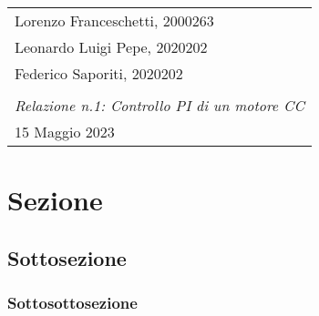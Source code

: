 \documentclass[a4paper, 11pt, Arial]{article}
\newcommand{\class}{Laboratorio di Automatica}
\newcommand{\expT}{Controllo PI di un motore CC}
\newcommand{\repN}{1}
\newcommand{\stud}{Lorenzo Franceschetti, 2000263\\ Leonardo Luigi Pepe, 2020202\\ Federico Saporiti, 2020202\\}
\newcommand{\dateD}{15 Maggio 2023}
\begin{document}

\begin{center}
\begin{tabular}{| p{\textwidth} |}
    \hline
    \large
    \vspace{-2pt}
    \stud \hfill
    \Large
    \begin{center}
    {\color{BrickRed}
        \textsl{\class}\\
        \textsl{Relazione n.\repN: \expT}\\
        \large
        \dateD}
    \vspace{-4mm}
    \end{center}\\
    \hline
\end{tabular}
\end{center}

\section{Sezione}
\subsection{Sottosezione}
\subsubsection{Sottosottosezione}
\end{document}
